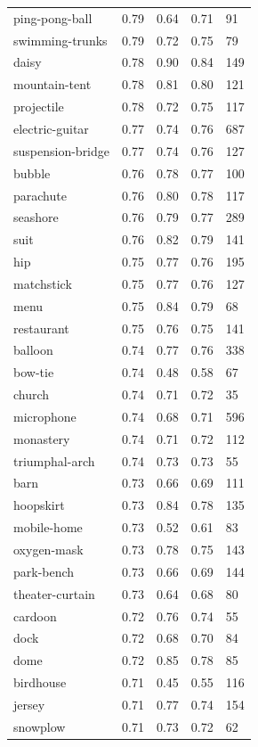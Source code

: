 \begin{center}
\begin{longtable}{lllll}
ping-pong-ball & 0.79 & 0.64 & 0.71 & 91 \\
swimming-trunks & 0.79 & 0.72 & 0.75 & 79 \\
daisy & 0.78 & 0.90 & 0.84 & 149 \\
mountain-tent & 0.78 & 0.81 & 0.80 & 121 \\
projectile & 0.78 & 0.72 & 0.75 & 117 \\
electric-guitar & 0.77 & 0.74 & 0.76 & 687 \\
suspension-bridge & 0.77 & 0.74 & 0.76 & 127 \\
bubble & 0.76 & 0.78 & 0.77 & 100 \\
parachute & 0.76 & 0.80 & 0.78 & 117 \\
seashore & 0.76 & 0.79 & 0.77 & 289 \\
suit & 0.76 & 0.82 & 0.79 & 141 \\
hip & 0.75 & 0.77 & 0.76 & 195 \\
matchstick & 0.75 & 0.77 & 0.76 & 127 \\
menu & 0.75 & 0.84 & 0.79 & 68 \\
restaurant & 0.75 & 0.76 & 0.75 & 141 \\
balloon & 0.74 & 0.77 & 0.76 & 338 \\
bow-tie & 0.74 & 0.48 & 0.58 & 67 \\
church & 0.74 & 0.71 & 0.72 & 35 \\
microphone & 0.74 & 0.68 & 0.71 & 596 \\
monastery & 0.74 & 0.71 & 0.72 & 112 \\
triumphal-arch & 0.74 & 0.73 & 0.73 & 55 \\
barn & 0.73 & 0.66 & 0.69 & 111 \\
hoopskirt & 0.73 & 0.84 & 0.78 & 135 \\
mobile-home & 0.73 & 0.52 & 0.61 & 83 \\
oxygen-mask & 0.73 & 0.78 & 0.75 & 143 \\
park-bench & 0.73 & 0.66 & 0.69 & 144 \\
theater-curtain & 0.73 & 0.64 & 0.68 & 80 \\
cardoon & 0.72 & 0.76 & 0.74 & 55 \\
dock & 0.72 & 0.68 & 0.70 & 84 \\
dome & 0.72 & 0.85 & 0.78 & 85 \\
birdhouse & 0.71 & 0.45 & 0.55 & 116 \\
jersey & 0.71 & 0.77 & 0.74 & 154 \\
snowplow & 0.71 & 0.73 & 0.72 & 62 \\

\end{longtable}
\end{center}
